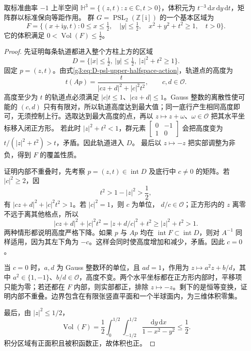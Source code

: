 \begin{lemma}\label{g3:lem:D-gaussian-fundamental-region}
	取标准曲率 \(-1\) 上半空间 \(\mathbb H^3=\{(z,t):z\in\mathbb C,t>0\}\)，体积元为 \(t^{-3}\,\mathrm dx\,\mathrm dy\,\mathrm dt\)，矩阵群以标准保向等距作用。
	群 \(G=\operatorname{PSL}_2(\mathbb Z[\mathrm i])\) 的一个基本区域为
	\begin{equation}\label{g3:eq:D-gaussian-fundamental-region}
		F=\{(x+\mathrm iy,t):0\le x\le\tfrac12,\quad
		   |y|\le\tfrac12,\quad x^2+y^2+t^2\ge1,\quad t>0\}.
	\end{equation}
	它的体积满足 \(0<\operatorname{Vol}(F)\le\tfrac12\)。
\end{lemma}
\begin{proof}
	先证明每条轨道都进入整个方柱上方的区域
	\[
		D=\{|x|\le\tfrac12,\ |y|\le\tfrac12,\ |z|^2+t^2\ge1\}.
	\]
	固定 \(p=(z,t)\)。由式\eqref{g3:eq:D-psl-upper-halfspace-action}，轨道点的高度为
	\[
		t(Ap)=\frac{t}{|cz+d|^2+|c|^2t^2},
		\qquad c,d\in\mathcal O.
	\]
	高度至少为 \(t\) 的轨道点必须满足
	\(|c|t\le1\)、\(|cz+d|\le1\)。Gauss 整数的离散性使可能的
	\((c,d)\) 只有有限对，所以轨道高度达到最大值；同一底行产生相同高度即可，无须控制上行。选取达到最大高度的点，再以
	\(z\mapsto z+\omega\)、\(\omega\in\mathcal O\) 把其水平坐标移入闭正方形。
	若此时 \(|z|^2+t^2<1\)，群元素
	\(\left[\begin{smallmatrix}0&-1\\1&0\end{smallmatrix}\right]\)
	会把高度变为 \(t/(|z|^2+t^2)>t\)，矛盾。因此轨道进入 \(D\)。
	最后以 \(z\mapsto-z\) 把实部调整为非负，得到 \(F\) 的覆盖性质。

	证明内部不重叠时，先考察 \(p=(z,t)\in\operatorname{int}D\) 及底行中
	\(c\ne0\) 的矩阵。若 \(|c|^2\ge2\)，因
	\[
		t^2>1-|z|^2>\frac12,
	\]
	有 \(|cz+d|^2+|c|^2t^2>1\)。若 \(|c|^2=1\)，则 \(c\) 为单位，
	\(d/c\in\mathcal O\)；正方形内的 \(z\) 离零不远于离其他格点，所以
	\[
		|cz+d|^2+|c|^2t^2
		    =|z+d/c|^2+t^2\ge|z|^2+t^2>1.
	\]
	两种情形都说明高度严格下降。如果 \(p\) 与 \(Ap\) 均在
	\(\operatorname{int}F\subset\operatorname{int}D\)，则对
	\(A^{-1}\) 同样适用，因为其左下角为 \(-c\)。这样会同时使高度增加和减少，矛盾。因此 \(c=0\)。

	当 \(c=0\) 时，\(a,d\) 为 Gauss 整数环的单位，且 \(ad=1\)，作用为
	\(z\mapsto a^2z+b/d\)，其中 \(a^2\in\{1,-1\}\)、\(b/d\in\mathcal O\)，高度不变。两个水平坐标都在正方形内部时，平移项只能为零；若还都在
	\(F\) 内部，则实部都正，排除 \(z\mapsto-z\)。剩下的是恒等变换，证明内部不重叠。边界包含在有限张竖直平面和一个半球面内，为三维体积零集。

	最后，由 \(|z|^2\le1/2\)，
	\[
		\operatorname{Vol}(F)
		=\frac12\int_0^{1/2}\int_{-1/2}^{1/2}
		       \frac{\mathrm dy\,\mathrm dx}{1-x^2-y^2}
		\le\frac12.
	\]
	积分区域有正面积且被积函数正，故体积也正。
\end{proof}

